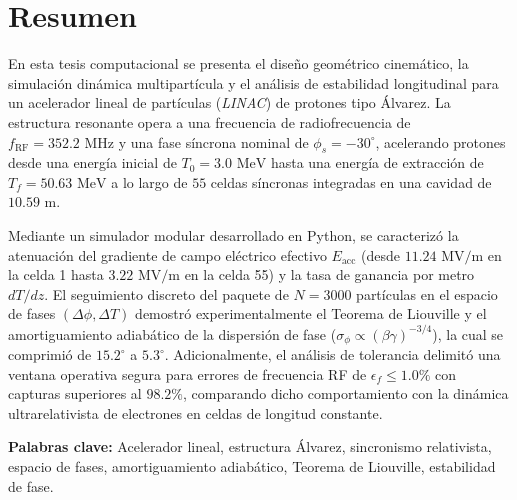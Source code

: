 \chapter*{Resumen}

En esta tesis computacional se presenta el diseño geométrico cinemático, la simulación dinámica multipartícula y el análisis de estabilidad longitudinal para un acelerador lineal de partículas (\textit{LINAC}) de protones tipo Álvarez. La estructura resonante opera a una frecuencia de radiofrecuencia de $f_{\text{RF}} = 352.2\text{ MHz}$ y una fase síncrona nominal de $\phi_s = -30^\circ$, acelerando protones desde una energía inicial de $T_0 = 3.0\text{ MeV}$ hasta una energía de extracción de $T_f = 50.63\text{ MeV}$ a lo largo de $55$ celdas síncronas integradas en una cavidad de $10.59\text{ m}$.

Mediante un simulador modular desarrollado en Python, se caracterizó la atenuación del gradiente de campo eléctrico efectivo $E_{\text{acc}}$ (desde $11.24\text{ MV/m}$ en la celda 1 hasta $3.22\text{ MV/m}$ en la celda 55) y la tasa de ganancia por metro $dT/dz$. El seguimiento discreto del paquete de $N = 3000$ partículas en el espacio de fases $(\Delta\phi, \Delta T)$ demostró experimentalmente el Teorema de Liouville y el amortiguamiento adiabático de la dispersión de fase ($\sigma_\phi \propto (\beta\gamma)^{-3/4}$), la cual se comprimió de $15.2^\circ$ a $5.3^\circ$. Adicionalmente, el análisis de tolerancia delimitó una ventana operativa segura para errores de frecuencia RF de $\epsilon_f \le 1.0\%$ con capturas superiores al $98.2\%$, comparando dicho comportamiento con la dinámica ultrarelativista de electrones en celdas de longitud constante.

\vspace{0.5cm}
\noindent\textbf{Palabras clave:} Acelerador lineal, estructura Álvarez, sincronismo relativista, espacio de fases, amortiguamiento adiabático, Teorema de Liouville, estabilidad de fase.
